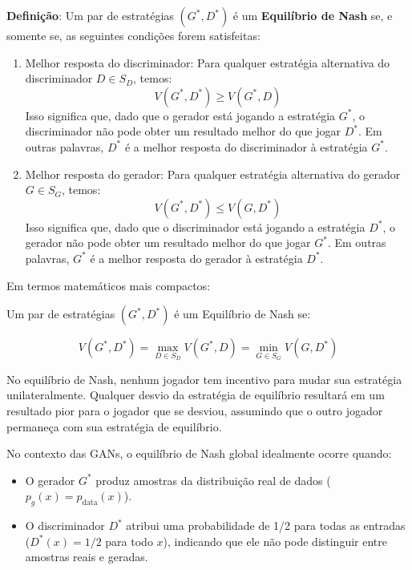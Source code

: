 \documentclass[a4paper]{tufte-handout}
\begin{document}
\textbf{Definição}: Um par de estratégias $(G^*, D^*)$ é um \textbf{Equilíbrio de Nash} se, e somente se, as seguintes condições forem satisfeitas:
\begin{enumerate}
    \item Melhor resposta do discriminador: Para qualquer estratégia alternativa do discriminador $D \in S_D$, temos:
    \begin{equation*}
    V(G^*, D^*) \geq V(G^*, D)
    \end{equation*}
    Isso significa que, dado que o gerador está jogando a estratégia $G^*$, o discriminador não pode obter um resultado melhor do que jogar $D^*$. Em outras palavras, $D^*$ é a melhor resposta do discriminador à estratégia $G^*$.
    \item Melhor resposta do gerador: Para qualquer estratégia alternativa do gerador $G \in S_G$, temos:
    \begin{equation*}
    V(G^*, D^*) \leq V(G, D^*)
    \end{equation*}
    Isso significa que, dado que o discriminador está jogando a estratégia $D^*$, o gerador não pode obter um resultado melhor do que jogar $G^*$. Em outras palavras, $G^*$ é a melhor resposta do gerador à estratégia $D^*$.
\end{enumerate}
    
Em termos matemáticos mais compactos:

Um par de estratégias $(G^*, D^*)$ é um Equilíbrio de Nash se:

\begin{equation*}
V(G^*, D^*) = \max_{D \in S_D} V(G^*, D) = \min_{G \in S_G} V(G, D^*)
\end{equation*}

No equilíbrio de Nash, nenhum jogador tem incentivo para mudar sua estratégia unilateralmente. Qualquer desvio da estratégia de equilíbrio resultará em um resultado pior para o jogador que se desviou, assumindo que o outro jogador permaneça com sua estratégia de equilíbrio.


No contexto das GANs, o equilíbrio de Nash global idealmente ocorre quando:

\begin{itemize}
    \item O gerador $G^*$ produz amostras da distribuição real de dados ($p_g(x) = p_{\text{data}}(x)$).
    \item O discriminador $D^*$ atribui uma probabilidade de 1/2 para todas as entradas ($D^*(x) = 1/2$ para todo $x$), indicando que ele não pode distinguir entre amostras reais e geradas.
\end{itemize} 
\end{document}
